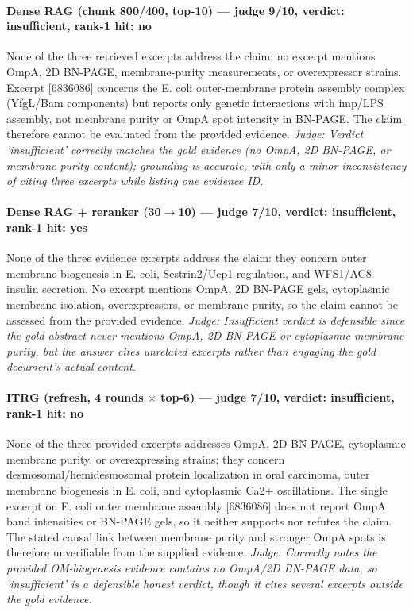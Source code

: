 \documentclass[sigconf, review, anonymous]{acmart}
\begin{document}
\paragraph{Dense RAG (chunk 800/400, top-10) --- judge 9/10, verdict: insufficient, rank-1 hit: no}
\noindent None of the three retrieved excerpts address the claim: no excerpt mentions OmpA, 2D BN-PAGE, membrane-purity measurements, or overexpressor strains. Excerpt [6836086] concerns the E. coli outer-membrane protein assembly complex (YfgL/Bam components) but reports only genetic interactions with imp/LPS assembly, not membrane purity or OmpA spot intensity in BN-PAGE. The claim therefore cannot be evaluated from the provided evidence.
\noindent\small\textit{Judge: Verdict 'insufficient' correctly matches the gold evidence (no OmpA, 2D BN-PAGE, or membrane purity content); grounding is accurate, with only a minor inconsistency of citing three excerpts while listing one evidence ID.}
\paragraph{Dense RAG + reranker (30$\to$10) --- judge 7/10, verdict: insufficient, rank-1 hit: yes}
\noindent None of the three evidence excerpts address the claim: they concern outer membrane biogenesis in E. coli, Sestrin2/Ucp1 regulation, and WFS1/AC8 insulin secretion. No excerpt mentions OmpA, 2D BN-PAGE gels, cytoplasmic membrane isolation, overexpressors, or membrane purity, so the claim cannot be assessed from the provided evidence.
\noindent\small\textit{Judge: Insufficient verdict is defensible since the gold abstract never mentions OmpA, 2D BN-PAGE or cytoplasmic membrane purity, but the answer cites unrelated excerpts rather than engaging the gold document's actual content.}
\paragraph{ITRG (refresh, 4 rounds $\times$ top-6) --- judge 7/10, verdict: insufficient, rank-1 hit: no}
\noindent None of the three provided excerpts addresses OmpA, 2D BN-PAGE, cytoplasmic membrane purity, or overexpressing strains; they concern desmosomal/hemidesmosomal protein localization in oral carcinoma, outer membrane biogenesis in E. coli, and cytoplasmic Ca2+ oscillations. The single excerpt on E. coli outer membrane assembly [6836086] does not report OmpA band intensities or BN-PAGE gels, so it neither supports nor refutes the claim. The stated causal link between membrane purity and stronger OmpA spots is therefore unverifiable from the supplied evidence.
\noindent\small\textit{Judge: Correctly notes the provided OM-biogenesis evidence contains no OmpA/2D BN-PAGE data, so 'insufficient' is a defensible honest verdict, though it cites several excerpts outside the gold evidence.}
\end{document}
